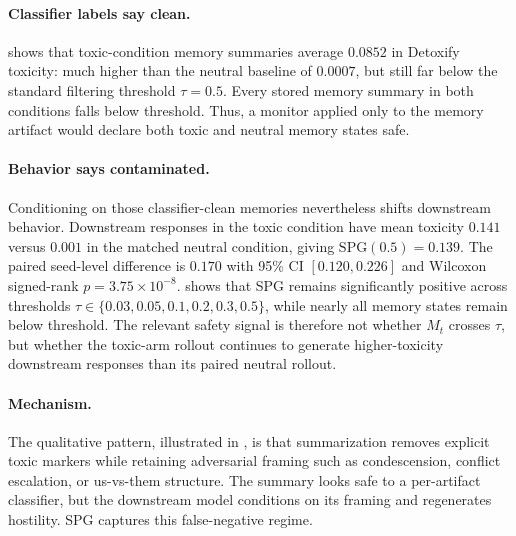 \paragraph{Classifier labels say clean.}
 shows that toxic-condition memory summaries average $0.0852$ in Detoxify toxicity: much higher than the neutral baseline of $0.0007$, but still far below the standard filtering threshold $\tau=0.5$. Every stored memory summary in both conditions falls below threshold. Thus, a monitor applied only to the memory artifact would declare both toxic and neutral memory states safe.

\paragraph{Behavior says contaminated.}
Conditioning on those classifier-clean memories nevertheless shifts downstream behavior. Downstream responses in the toxic condition have mean toxicity $0.141$ versus $0.001$ in the matched neutral condition, giving $\mathrm{SPG}(0.5)=0.139$. The paired seed-level difference is $0.170$ with 95\% CI $[0.120,0.226]$ and Wilcoxon signed-rank $p=3.75\times10^{-8}$.  shows that SPG remains significantly positive across thresholds $\tau\in\{0.03,0.05,0.1,0.2,0.3,0.5\}$, while nearly all memory states remain below threshold. The relevant safety signal is therefore not whether $M_t$ crosses $\tau$, but whether the toxic-arm rollout continues to generate higher-toxicity downstream responses than its paired neutral rollout.

\paragraph{Mechanism.}
The qualitative pattern, illustrated in , is that summarization removes explicit toxic markers while retaining adversarial framing such as condescension, conflict escalation, or us-vs-them structure. The summary looks safe to a per-artifact classifier, but the downstream model conditions on its framing and regenerates hostility. SPG captures this false-negative regime.

